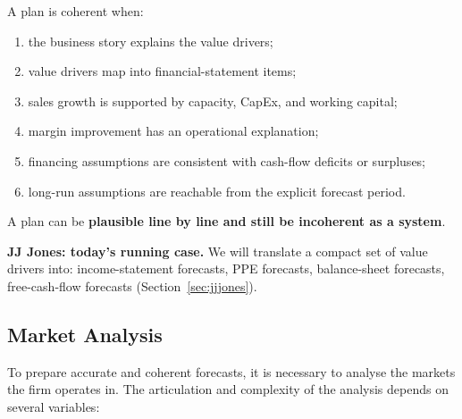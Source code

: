 A plan is coherent when:
\begin{enumerate}
  \item the business story explains the value drivers;
  \item value drivers map into financial-statement items;
  \item sales growth is supported by capacity, CapEx, and working capital;
  \item margin improvement has an operational explanation;
  \item financing assumptions are consistent with cash-flow deficits or surpluses;
  \item long-run assumptions are reachable from the explicit forecast period.
\end{enumerate}
\begin{keybox}
A plan can be \textbf{plausible line by line and still be incoherent as a system}.
\end{keybox}

\textbf{JJ Jones: today's running case.} We will translate a compact set of value drivers into: income-statement forecasts, PPE forecasts, balance-sheet forecasts, free-cash-flow forecasts (Section~\ref{sec:jjjones}).

\subsection[Market Analysis]{Market Analysis }

To prepare accurate and coherent forecasts, it is necessary to analyse the markets the firm operates in. The articulation and complexity of the analysis depends on several variables:
\begin{center}
\end{center}

